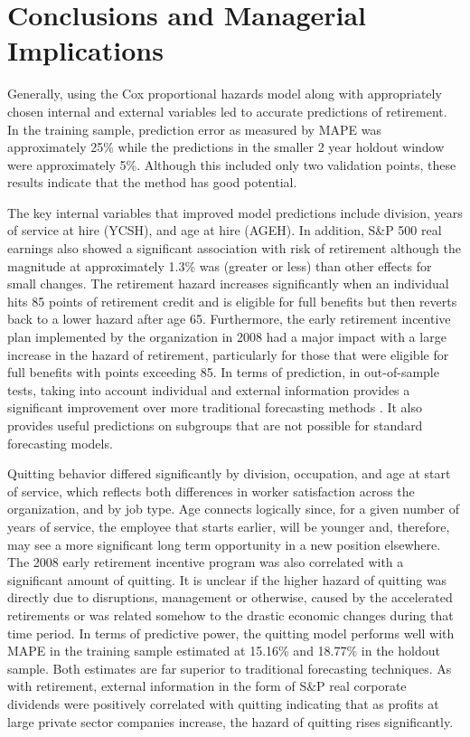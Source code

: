 \begin{table}[]
\begin{tabular}{llllllllllll}
	\end{tabular}
\end{table}



\section{Conclusions and Managerial Implications}

Generally, using the Cox proportional hazards model along with appropriately chosen internal and external variables led to accurate predictions of retirement.  In the training sample, prediction error as measured by MAPE was approximately 25\% while the predictions in the smaller 2 year holdout window were approximately 5\%.  Although this included only two validation points, these results indicate that the method has good potential.

The key internal variables that improved model predictions include division, years of service at hire (YCSH), and age at hire (AGEH).  In addition, S\&P 500 real earnings also showed a significant association with risk of retirement although the magnitude at approximately 1.3\% was (greater or less) than other effects for small changes. The retirement hazard increases significantly when an individual hits 85 points of retirement credit and is eligible for full benefits but then reverts back to a lower hazard after age 65.  Furthermore, the early retirement incentive plan implemented by the organization in 2008 had a major impact with a large increase in the hazard of retirement, particularly for those that were eligible for full benefits with points exceeding 85.  In terms of prediction, in out-of-sample tests, taking into account individual and external information provides a significant improvement over more traditional forecasting methods \citet{feldman1994}.  It also provides useful predictions on subgroups that are not possible for standard forecasting models.

Quitting behavior differed significantly by division, occupation, and age at start of service, which reflects both differences in worker satisfaction across the organization, and by job type. Age connects logically since, for a given number of years of service, the employee that starts earlier, will be younger and, therefore, may see a more significant long term opportunity in a new position elsewhere.  The 2008 early retirement incentive program was also correlated with a significant amount of quitting.  It is unclear if the higher hazard of quitting was directly due to disruptions, management or otherwise, caused by the accelerated retirements or was related somehow to the drastic economic changes during that time period.  In terms of predictive power, the quitting model performs well with MAPE in the training sample estimated at 15.16\% and 18.77\% in the holdout sample.
Both estimates are far superior to traditional forecasting techniques.  As with retirement, external information in the form of S\&P real corporate dividends were positively correlated with quitting indicating that as profits at large private sector companies increase, the hazard of quitting rises significantly.

